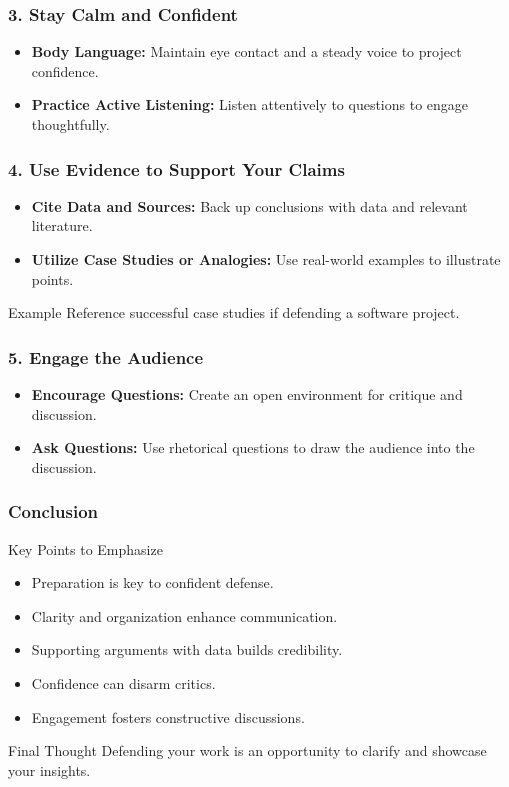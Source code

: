 \documentclass[aspectratio=169]{beamer}
\begin{document}
\begin{frame}[fragile]
    \frametitle{3. Stay Calm and Confident}
    \begin{itemize}
        \item \textbf{Body Language:} 
            Maintain eye contact and a steady voice to project confidence.
        \item \textbf{Practice Active Listening:} 
            Listen attentively to questions to engage thoughtfully.
    \end{itemize}
\end{frame}

\begin{frame}[fragile]
    \frametitle{4. Use Evidence to Support Your Claims}
    \begin{itemize}
        \item \textbf{Cite Data and Sources:} 
            Back up conclusions with data and relevant literature.
        \item \textbf{Utilize Case Studies or Analogies:} 
            Use real-world examples to illustrate points.
    \end{itemize}
    \begin{exampleblock}{Example}
        Reference successful case studies if defending a software project.
    \end{exampleblock}
\end{frame}

\begin{frame}[fragile]
    \frametitle{5. Engage the Audience}
    \begin{itemize}
        \item \textbf{Encourage Questions:} 
            Create an open environment for critique and discussion.
        \item \textbf{Ask Questions:} 
            Use rhetorical questions to draw the audience into the discussion.
    \end{itemize}
\end{frame}

\begin{frame}[fragile]
    \frametitle{Conclusion}
    \begin{block}{Key Points to Emphasize}
        \begin{itemize}
            \item Preparation is key to confident defense.
            \item Clarity and organization enhance communication.
            \item Supporting arguments with data builds credibility.
            \item Confidence can disarm critics.
            \item Engagement fosters constructive discussions.
        \end{itemize}
    \end{block}
    \begin{block}{Final Thought}
        Defending your work is an opportunity to clarify and showcase your insights.
    \end{block}
\end{frame}
\end{document}
